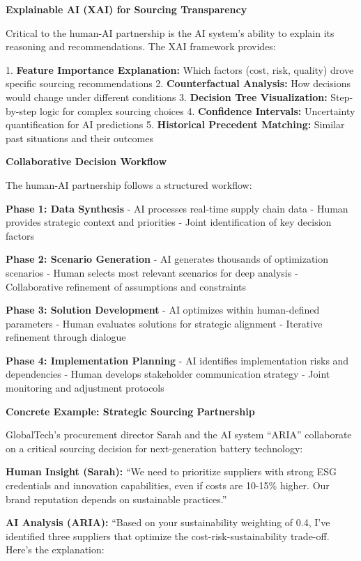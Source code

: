 \documentclass{article}
\begin{document}
\textbf{Explainable AI (XAI) for Sourcing Transparency}

Critical to the human-AI partnership is the AI system's ability to explain its reasoning and recommendations. The XAI framework provides:

1. \textbf{Feature Importance Explanation:} Which factors (cost, risk, quality) drove specific sourcing recommendations
2. \textbf{Counterfactual Analysis:} How decisions would change under different conditions
3. \textbf{Decision Tree Visualization:} Step-by-step logic for complex sourcing choices
4. \textbf{Confidence Intervals:} Uncertainty quantification for AI predictions
5. \textbf{Historical Precedent Matching:} Similar past situations and their outcomes

\textbf{Collaborative Decision Workflow}

The human-AI partnership follows a structured workflow:

\textbf{Phase 1: Data Synthesis}
- AI processes real-time supply chain data
- Human provides strategic context and priorities  
- Joint identification of key decision factors

\textbf{Phase 2: Scenario Generation}
- AI generates thousands of optimization scenarios
- Human selects most relevant scenarios for deep analysis
- Collaborative refinement of assumptions and constraints

\textbf{Phase 3: Solution Development}
- AI optimizes within human-defined parameters
- Human evaluates solutions for strategic alignment
- Iterative refinement through dialogue

\textbf{Phase 4: Implementation Planning}
- AI identifies implementation risks and dependencies
- Human develops stakeholder communication strategy
- Joint monitoring and adjustment protocols

\textbf{Concrete Example: Strategic Sourcing Partnership}

GlobalTech's procurement director Sarah and the AI system ``ARIA'' collaborate on a critical sourcing decision for next-generation battery technology:

\textbf{Human Insight (Sarah):} ``We need to prioritize suppliers with strong ESG credentials and innovation capabilities, even if costs are 10-15\% higher. Our brand reputation depends on sustainable practices.''

\textbf{AI Analysis (ARIA):} ``Based on your sustainability weighting of 0.4, I've identified three suppliers that optimize the cost-risk-sustainability trade-off. Here's the explanation:
\end{document}
